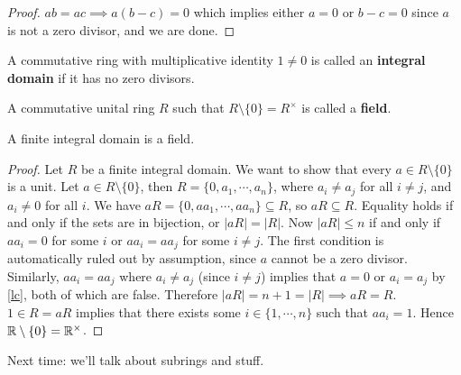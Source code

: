 \begin{proof}
    $ab=ac \implies a(b-c)=0$ which implies either $a=0$ or $b-c=0$ since $a$ is not a zero divisor, and we are done.
\end{proof}
\begin{definition}
    A commutative ring with multiplicative identity $1\neq 0$ is called an \textbf{integral domain} if it has no zero divisors.
\end{definition}
\begin{definition}[Field]
    A commutative unital ring $R$ such that $R\setminus \{0\} =R^{\times }$ is called a \textbf{field}.
\end{definition}
\begin{prop}
    A finite integral domain is a field.
\end{prop}
\begin{proof}
    Let $R$ be a finite integral domain. We want to show that every $a\in R\setminus \{0\} $ is a unit. Let $a\in R\setminus \{0\} $, then $R=\{0,a_1,\cdots ,a_n \} $, where $a_i \neq a_{j}$ for all $i\neq j$, and $a_i \neq 0$ for all $i$. We have $aR=\{0,aa_1,\cdots ,aa_n \} \subseteq R$, so $aR\subseteq R$. Equality holds if and only if the sets are in bijection, or $|aR|=|R|$. Now $|aR|\leq n$ if and only if $aa_i =0$ for some $i$ or $aa_i =aa_{j}$ for some $i\neq j$. The first condition is automatically ruled out by assumption, since $a$ cannot be a zero divisor. Similarly, $aa_i =aa_{j}$ where $a_i \neq a_j$ (since $i\neq j$) implies that $a=0$ or $a_i=a_j$ by \cref{lc}, both of which are false. Therefore $|aR|=n+1=|R|\implies aR=R$. $1\in R=aR$ implies that there exists some $i\in \{1,\cdots ,n\} $ such that $aa_i =1$. Hence $\mathbb{R}\setminus \{0\} =\mathbb{R}^{\times }$.
\end{proof}
Next time: we'll talk about subrings and stuff.








